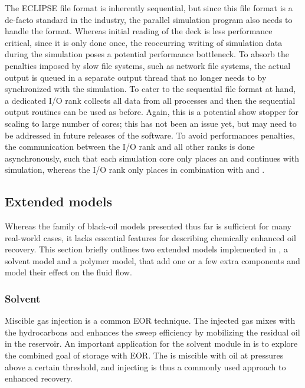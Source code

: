 The ECLIPSE file format is inherently sequential, but since this file format is a de-facto standard in the
industry, the parallel simulation program also needs to handle the format. 
Whereas initial reading of the deck is less performance critical, since it is
only done once, the reoccurring writing of simulation data during the simulation
poses a potential performance bottleneck. To absorb the penalties imposed by
slow file systems, such as network file systems, the actual output is queued in a 
separate output thread that no longer needs to by synchronized with the simulation.
To cater to the sequential file format at hand, a dedicated I/O rank collects all
data from all processes and then the sequential output routines can be used as
before. Again, this is a potential show stopper for scaling to large number of
cores; this has not been an issue yet, but may need to be addressed in future
releases of the software. 
To avoid performances penalties, the communication between the I/O rank
and all other ranks is done asynchronously, such that each simulation core only
places an  and continues with simulation, whereas the I/O rank 
only places  in combination with  and
. 

\subsection{Extended models}

Whereas the family of black-oil models presented thus far is sufficient for many
real-world cases, it lacks essential features for describing chemically enhanced oil
recovery. This section briefly outlines two extended models implemented in \opmflow, a solvent
model and a polymer model, that add one or a few extra components and model their effect
on the fluid flow.


\subsubsection{Solvent}\label{sec:solvent}

Miscible gas injection is a common EOR technique. The injected gas mixes with the hydrocarbons and enhances the sweep efficiency by mobilizing the residual oil in the reservoir. An important application for the solvent module in \opm is to explore the combined goal of \COto storage with EOR. The \COto is miscible with oil at pressures above a certain threshold, and injecting \COto is thus a commonly used approach to enhanced recovery. 

